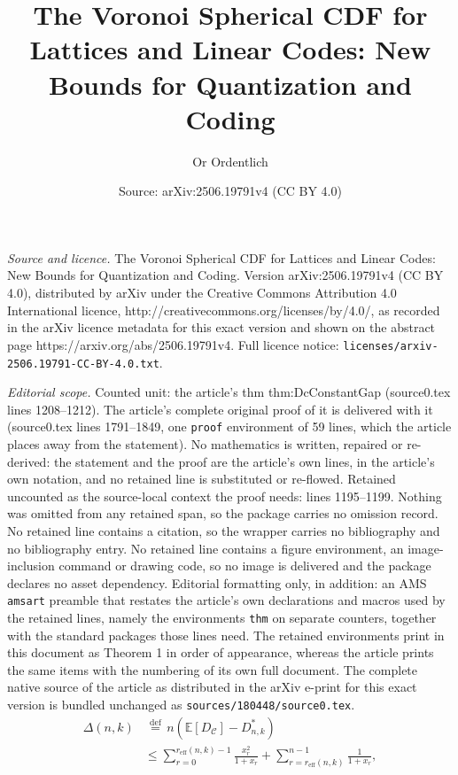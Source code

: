 \documentclass[10pt,a4paper]{amsart}
\title{The Voronoi Spherical CDF for Lattices and Linear Codes: New Bounds for Quantization and Coding}
\author{Or Ordentlich}
\date{Source: arXiv:2506.19791v4 (CC BY 4.0)}
\newcommand{\CC}{{\mathcal{C}}}
\newcommand{\EE}{{\mathbb{E}}}
\newcommand{\df}{{\, \stackrel{\mathrm{def}}{=}\, }}
\newcommand{\reff}{{r_{\mathrm{eff}}}}
\begin{document}
\maketitle

\noindent\emph{Source and licence.} The Voronoi Spherical CDF for Lattices and Linear Codes: New Bounds for Quantization and Coding. Version arXiv:2506.19791v4 (CC BY 4.0), distributed by arXiv under the Creative Commons Attribution 4.0 International licence, http://creativecommons.org/licenses/by/4.0/, as recorded in the arXiv licence metadata for this exact version and shown on the abstract page https://arxiv.org/abs/2506.19791v4. Full licence notice: \texttt{licenses/arxiv-2506.19791-CC-BY-4.0.txt}.\par\smallskip

\noindent\textit{Editorial scope.} Counted unit: the article's thm thm:DcConstantGap (source0.tex lines 1208--1212). The article's complete original proof of it is delivered with it (source0.tex lines 1791--1849, one \texttt{proof} environment of 59 lines, which the article places away from the statement). No mathematics is written, repaired or re-derived: the statement and the proof are the article's own lines, in the article's own notation, and no retained line is substituted or re-flowed.  Retained uncounted as the source-local context the proof needs: lines 1195--1199.  Nothing was omitted from any retained span, so the package carries no omission record.  No retained line contains a citation, so the wrapper carries no bibliography and no bibliography entry.  No retained line contains a figure environment, an image-inclusion command or drawing code, so no image is delivered and the package declares no asset dependency.  Editorial formatting only, in addition: an AMS \texttt{amsart} preamble that restates the article's own declarations and macros used by the retained lines, namely the environments \texttt{thm} on separate counters, together with the standard packages those lines need.  The retained environments print in this document as Theorem 1 in order of appearance, whereas the article prints the same items with the numbering of its own full document.  The complete native source of the article as distributed in the arXiv e-print for this exact version is bundled unchanged as \texttt{sources/180448/source0.tex}.
\begin{align}
\Delta(n,k)&\df n(\EE[D_\CC]-D^*_{n,k})\\
&\leq\sum_{r=0}^{\reff(n,k)-1}\frac{x_r^2}{1+x_r}+\sum_{r=\reff(n,k)}^{n-1} \frac{1}{1+x_r},   
\label{eq:Deltank}
\end{align}
\end{document}
